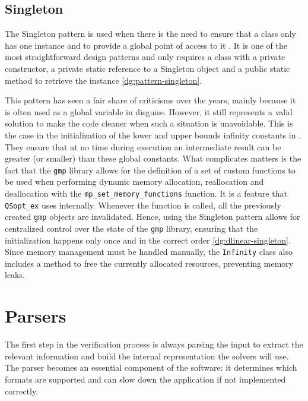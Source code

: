 \subsection*{Singleton}

The Singleton pattern is used when there is the need to ensure that a class only has one instance and to provide a global point of access to it \cite{book:gof}.
It is one of the most straightforward design patterns and only requires a class with a private constructor, a private static reference to a Singleton object and a public static method to retrieve the instance \autoref{dg:pattern-singleton}.


This pattern has seen a fair share of criticisms over the years, mainly because it is often used as a global variable in disguise.
However, it still represents a valid solution to make the code cleaner when such a situation is unavoidable.
This is the case in the initialization of the lower and upper bounds infinity constants in \dlinear.
They ensure that at no time during execution an intermediate result can be greater (or smaller) than these global constants.
What complicates matters is the fact that the \texttt{gmp} library allows for the definition of a set of custom functions to be used when performing dynamic memory allocation, reallocation and deallocation with the \texttt{mp\_set\_memory\_functions} function.
It is a feature that \texttt{QSopt\_ex} uses internally.
Whenever the function is called, all the previously created \texttt{gmp} objects are invalidated.
Hence, using the Singleton pattern allows for centralized control over the state of the \texttt{gmp} library, ensuring that the initialization happens only once and in the correct order \autoref{dg:dlinear-singleton}.
Since memory management must be handled manually, the \texttt{Infinity} class also includes a method to free the currently allocated resources, preventing memory leaks.


\section{Parsers}

The first step in the verification process is always parsing the input to extract the relevant information and build the internal representation the solvers will use.
The parser becomes an essential component of the software: it determines which formats are supported and can slow down the application if not implemented correctly.

